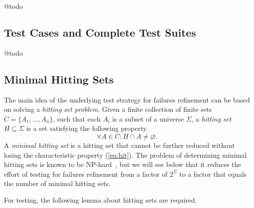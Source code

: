@todo 


\subsection{Test Cases and Complete Test Suites}
\label{sec:cspcompletedef}

@todo

\subsection{Minimal Hitting Sets}
\label{sec:hit}

The main idea of the underlying test strategy for failures refinement can be
based on solving a \emph{hitting set problem}. Given a finite collection of
finite sets $C = \{ A_1,\dots,A_n\}$, such that each $A_i$ is a subset of a
universe $\Sigma$, a \emph{hitting set} $H\subseteq\Sigma$ is a set
satisfying the following property.
%
\begin{equation}
  \label{eq:hit}
  \forall A\in C: H\cap A \neq\varnothing.
\end{equation}
%
A \emph{minimal hitting set} is a hitting set that cannot be further reduced
without losing the characteristic property (\ref{eq:hit}). The problem of
determining minimal hitting sets is known to be
NP-hard~\cite{Book1975-BOOKRM}, but we will see below that it reduces the
effort of testing for failures refinement from a factor of $2^\Sigma$ to a
factor that equals the number of minimal hitting sets.

For testing, the following lemma about hitting sets are required.

